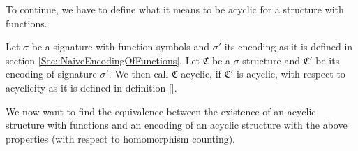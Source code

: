 To continue, we have to define what it means to be acyclic for a structure with functions.

\begin{definition}
	Let $\sigma$ be a signature with function-symbols and $\sigma'$ its encoding as it is defined in section \ref{Sec::NaiveEncodingOfFunctions}.
	Let $\mathfrak C$ be a $\sigma$-structure and $\mathfrak C'$ be its encoding of signature $\sigma'$.
	We then call $\mathfrak C$ acyclic, if $\mathfrak C'$ is acyclic, with respect to acyclicity as it is defined in definition \ref{}.
\end{definition}

We now want to find the equivalence between the existence of an acyclic structure with functions and an encoding of an acyclic structure with the above properties (with respect to homomorphism counting).

